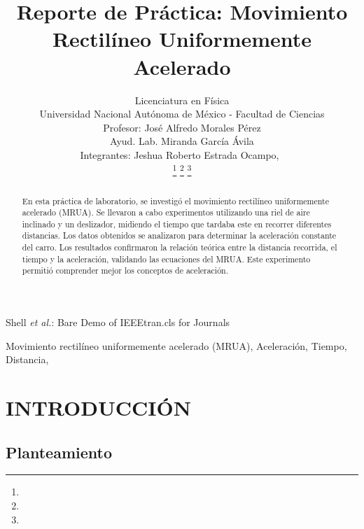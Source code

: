 \documentclass[journal]{IEEEtran}
\begin{document}
\title{Reporte de Práctica: Movimiento Rectilíneo Uniformemente Acelerado}

\author{Licenciatura en Física	\\
Universidad Nacional Autónoma de México - Facultad de Ciencias\\
Profesor: José Alfredo Morales Pérez\\
Ayud. Lab.	Miranda García Ávila\\
Integrantes: Jeshua Roberto Estrada Ocampo,~\\

            
\thanks{}%
\thanks{}%
\thanks{}}

%
{Shell \MakeLowercase{\textit{et al.}}: Bare Demo of IEEEtran.cls for Journals}

\maketitle

\begin{abstract}
En esta práctica de laboratorio, se investigó el movimiento rectilíneo uniformemente acelerado (MRUA). Se llevaron a cabo experimentos utilizando una riel de aire inclinado y un deslizador, midiendo el tiempo que tardaba este en recorrer diferentes distancias. Los datos obtenidos se analizaron para determinar la aceleración constante del carro. Los resultados confirmaron la relación teórica entre la distancia recorrida, el tiempo y la aceleración, validando las ecuaciones del MRUA. Este experimento permitió comprender mejor los conceptos de aceleración.
\end{abstract}

\begin{IEEEkeywords}
Movimiento rectilíneo uniformemente acelerado (MRUA), Aceleración, Tiempo, Distancia, 
\end{IEEEkeywords}

\IEEEpeerreviewmaketitle

\section{INTRODUCCIÓN}
\subsection{Planteamiento}
\end{document}
